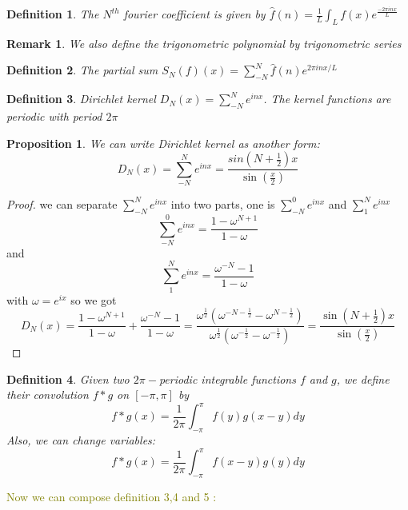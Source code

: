 \documentclass{article}
\newtheorem{definition}{Definition}
\newtheorem{proposition}{Proposition}
\newtheorem{remark}{Remark}
\begin{document}
\begin{definition}%
    The $ N^{th} $ fourier coefficient is given by $ \hat{f}(n) =  \frac{1}{L} \int_{L}f(x)e^{\frac{-2\pi inx}{L}}$
\end{definition}

\begin{remark}%
   We also define the trigonometric polynomial by trigonometric series 
\end{remark}

\begin{definition}%
    The partial sum $ S_N(f)(x)=\sum\limits_{-N}^{N}\hat{f}(n)e^{2\pi inx/L} $
\end{definition}

\begin{definition}%
    Dirichlet kernel $ D_N(x)=\sum\limits_{-N}^{N}e^{inx} $.  The kernel functions are periodic with period $ 2\pi $
\end{definition}




\begin{proposition}%
    We can write  Dirichlet kernel as another form:
    \[  D_N(x)=\sum\limits_{-N}^{N}e^{inx}=\frac{sin(N+\frac{1}{2})x}{\sin(\frac{x}{2})}\]
\end{proposition}
\begin{proof}
    we can separate $ \sum\limits_{-N}^{N}e^{inx} $ into two parts, one is $ \sum\limits_{-N}^{0}e^{inx} $ and $ \sum\limits_{1}^{N}e^{inx} $
    \[  \sum\limits_{-N}^{0}e^{inx} = \frac{1-\omega^{N+1}}{1-\omega}\]
    and \[  \sum\limits_{1}^{N}e^{inx}=\frac{\omega^{-N}-1}{1-\omega} \]
    with $ \omega = e^{ix} $
    so we got \[ D_N(x)= \frac{1-\omega^{N+1}}{1-\omega} +\frac{\omega^{-N}-1}{1-\omega}= \frac{\omega^{\frac{1}{2}}(\omega^{-N-\frac{1}{2}}-\omega^{N-\frac{1}{2}})}{\omega^{\frac{1}{2}}(\omega^{-\frac{1}{2}}-\omega^{-\frac{1}{2}})}   =  \frac{\sin(N+\frac{1}{2})x}{\sin(\frac{x}{2})} \]
\end{proof}

\begin{definition}%
    Given two $ 2\pi -$periodic integrable functions $ f $ and $ g $, we define their convolution $ f*g $ on $ [-\pi,\pi] $ by 
    \[ f*g(x)=\frac{1}{2\pi} \int_{-\pi}^{\pi} f(y)g(x-y)dy\]
    Also, we can change variables:
    \[ f*g(x)=\frac{1}{2\pi} \int_{-\pi}^{\pi} f(x-y)g(y)dy\]
\end{definition}


\textcolor{olive}{Now we can compose definition 3,4 and 5 :}
\end{document}
